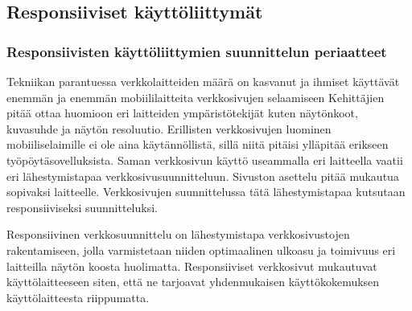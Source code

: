 \documentclass[11pt,a4paper,titlepage,oneside]{article}
\begin{document}
\newpage
{}                %




\newpage
{}%






\newpage
{}        %













\newpage
\subsection{Responsiiviset käyttöliittymät}        %



\subsubsection{Responsiivisten käyttöliittymien suunnittelun periaatteet}




Tekniikan parantuessa verkkolaitteiden määrä on kasvanut ja ihmiset käyttävät enemmän ja enemmän mobiililaitteita verkkosivujen selaamiseen
Kehittäjien pitää ottaa huomioon eri laitteiden ympäristötekijät kuten näytönkoot, kuvasuhde ja näytön resoluutio.
Erillisten verkkosivujen luominen mobiiliselaimille ei ole aina käytännöllistä, sillä niitä pitäisi ylläpitää erikseen työpöytäsovelluksista.
Saman verkkosivun käyttö useammalla eri laitteella vaatii eri lähestymistapaa verkkosivusuunnitteluun. 
Sivuston asettelu pitää mukautua sopivaksi laitteelle.
Verkkosivujen suunnittelussa tätä lähestymistapaa kutsutaan responsiiviseksi suunnitteluksi.
\medskip



Responsiivinen verkkosuunnittelu on lähestymistapa verkkosivustojen rakentamiseen,
jolla varmistetaan niiden optimaalinen ulkoasu ja toimivuus eri laitteilla näytön koosta huolimatta. 
Responsiiviset verkkosivut mukautuvat käyttölaitteeseen siten, että ne tarjoavat yhdenmukaisen käyttökokemuksen käyttölaitteesta riippumatta.
\medskip
\end{document}
